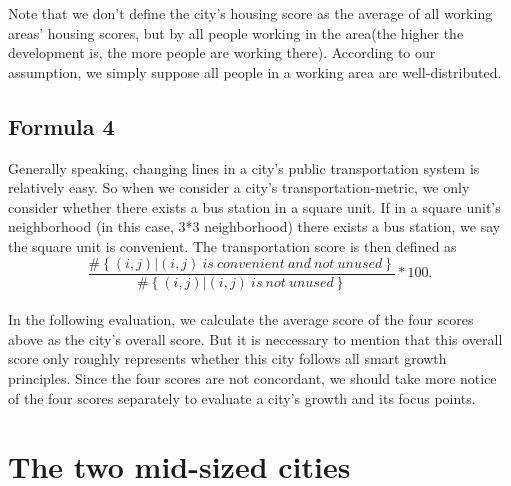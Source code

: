 Note that we don't define the city's housing score as the average of all working areas' housing scores, but by all people working in the area(the higher the development is, the more people are working there).
According to our assumption, we simply suppose all people in a working area are well-distributed.\\

\subsection{Formula 4}
Generally speaking, changing lines in a city's public transportation system is relatively easy.
So when we consider a city's transportation-metric, we only consider whether there exists a bus station in a square unit.
If in a square unit's neighborhood (in this case, 3*3 neighborhood) there exists a bus station, we say the square unit is convenient.
The transportation score is then defined as $$ \frac{\#\left\{(i,j)|(i,j) \ is \ convenient\ and \ not\  unused\right\}}{\#\left\{(i,j)|(i,j) \ is \ not \ unused\right\}} * 100. $$\\

In the following evaluation, we calculate the average score of the four scores above as the city's overall score.
But it is neccessary to mention that this overall score only roughly represents whether this city follows all smart growth principles.
Since the four scores are not concordant, we should take more notice of the four scores separately to evaluate a city's growth and its focus points.\\


\section{The two mid-sized cities}

